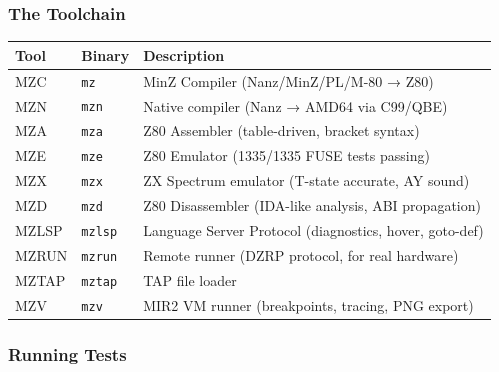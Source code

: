 \documentclass[
  11pt,
  a4paper,
]{report}
\begin{document}
\subsubsection{The Toolchain}\label{the-toolchain}

\begin{longtable}[]{@{}
  >{\raggedright\arraybackslash}p{}
  >{\raggedright\arraybackslash}p{}
  >{\raggedright\arraybackslash}p{}@{}}
\toprule\noalign{}
\begin{minipage}[b]{\linewidth}\raggedright
Tool
\end{minipage} & \begin{minipage}[b]{\linewidth}\raggedright
Binary
\end{minipage} & \begin{minipage}[b]{\linewidth}\raggedright
Description
\end{minipage} \\
\midrule\noalign{}
\endhead
\bottomrule\noalign{}
\endlastfoot
MZC & \texttt{mz} & MinZ Compiler (Nanz/MinZ/PL/M-80 → Z80) \\
MZN & \texttt{mzn} & Native compiler (Nanz → AMD64 via C99/QBE) \\
MZA & \texttt{mza} & Z80 Assembler (table-driven, bracket syntax) \\
MZE & \texttt{mze} & Z80 Emulator (1335/1335 FUSE tests passing) \\
MZX & \texttt{mzx} & ZX Spectrum emulator (T-state accurate, AY
sound) \\
MZD & \texttt{mzd} & Z80 Disassembler (IDA-like analysis, ABI
propagation) \\
MZLSP & \texttt{mzlsp} & Language Server Protocol (diagnostics, hover,
goto-def) \\
MZRUN & \texttt{mzrun} & Remote runner (DZRP protocol, for real
hardware) \\
MZTAP & \texttt{mztap} & TAP file loader \\
MZV & \texttt{mzv} & MIR2 VM runner (breakpoints, tracing, PNG
export) \\
\end{longtable}

\subsubsection{Running Tests}\label{running-tests}
\end{document}
